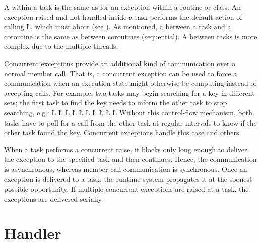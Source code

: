 \documentclass[openright,twoside]{report}
\begin{document}
A  within a task is the same as for an exception within a routine or class.
An exception raised and not handled inside a task performs the \CC default action of calling \LGinlinetrue\LGbegin\lgrinde\L{}\endlgrinde\LGend{}, which must abort (see ).
As mentioned, a  between a task and a coroutine is the same as between coroutines (sequential).
A  between tasks is more complex due to the multiple threads.

Concurrent exceptions provide an additional kind of communication over a normal member call.
That is, a concurrent exception can be used to force a communication when an execution state might otherwise be computing instead of accepting calls.
For example, two tasks may begin searching for a key in different sets;
the first task to find the key needs to inform the other task to stop searching, e.g.:
\LGinlinefalse\LGbegin\lgrinde
\L{}
\L{\LB{}}
\CE{}\L{\LB{}}
\L{\LB{}}
\L{\LB{}}
\L{\LB{}}
\CE{}\L{\LB{}}
\L{\LB{}}
\CE{}\L{\LB{}}
\L{\LB{}}
\endlgrinde\LGend
Without this control-flow mechanism, both tasks have to poll for a call from the other task at regular intervals to know if the other task found the key.
Concurrent exceptions handle this case and others.

When a task performs a concurrent raise, it blocks only long enough to deliver the exception to the specified task and then continues.
Hence, the communication is asynchronous, whereas member-call communication is synchronous.
Once an exception is delivered to a task, the runtime system propagates it at the soonest possible opportunity.
If multiple concurrent-exceptions are raised at a task, the exceptions are delivered serially.


\section{Handler}
\end{document}
